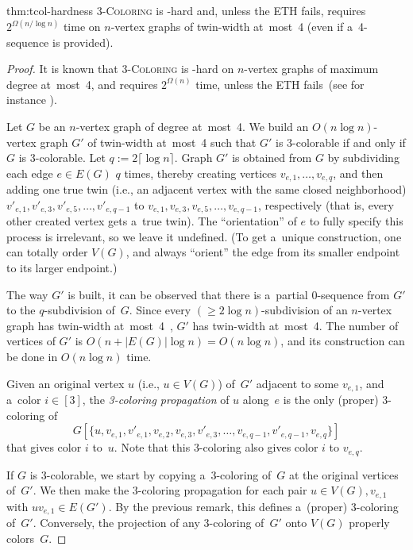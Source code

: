 \documentclass[a4paper,USenglish,cleveref,hyperref,autoref]{lipics-v2021}
\newcommand{\tcol}{\textsc{3-Coloring}\xspace}
\begin{document}
\begin{reptheorem}{thm:tcol-hardness}
  \tcol is \NP-hard and, unless the ETH fails, requires $2^{\Omega(n/\log n)}$ time on $n$-vertex graphs of twin-width at~most~4 (even if a~4-sequence is provided).  
\end{reptheorem}

\begin{proof}
  It is known that \tcol is \NP-hard on $n$-vertex graphs of maximum degree at~most~4, and requires $2^{\Omega(n)}$ time, unless the ETH fails~(see for instance \cite[Lemma 1]{CyganFGKMPS17}).
  
  Let $G$ be an $n$-vertex graph of degree at~most~4.
  We build an $O(n \log n)$-vertex graph $G'$ of twin-width at~most~4 such that $G'$ is 3-colorable if and only if $G$ is 3-colorable.
  Let $q := 2 \lceil \log n \rceil$.
  Graph $G'$ is obtained from $G$ by subdividing each edge $e \in E(G)$ $q$ times, thereby creating vertices $v_{e,1}, \ldots, v_{e,q}$, and then adding one true twin (i.e., an adjacent vertex with the same closed neighborhood) $v'_{e,1}, v'_{e,3}, v'_{e,5}, \ldots, v'_{e,q-1}$ to $v_{e,1}, v_{e,3}, v_{e,5}, \ldots, v_{e,q-1}$, respectively (that is, every other created vertex gets a~true twin).
  The ``orientation'' of $e$ to fully specify this process is irrelevant, so we leave it undefined.
  (To get a~unique construction, one can totally order $V(G)$, and always ``orient'' the edge from its smaller endpoint to its larger endpoint.)

  The way $G'$ is built, it can be observed that there is a~partial 0-sequence from $G'$ to the $q$-subdivision of~$G$.
  Since every $(\geqslant 2 \log n)$-subdivision of an $n$-vertex graph has twin-width at~most~4~\cite{BergeBonnetDepres}, $G'$ has twin-width at~most~4.
  The number of vertices of $G'$ is $O(n+|E(G)| \log n)=O(n \log n)$, and its construction can be done in $O(n \log n)$ time.

  Given an original vertex $u$ (i.e., $u \in V(G)$) of~$G'$ adjacent to some $v_{e,1}$, and a~color $i \in [3]$, the \emph{3-coloring propagation} of $u$ along~$e$ is the only (proper) 3-coloring of \[G[\{u,v_{e,1},v'_{e,1},v_{e,2},v_{e,3},v'_{e,3}, \ldots, v_{e,q-1},v'_{e,q-1},v_{e,q}\}]\] that gives color $i$ to~$u$.
  Note that this 3-coloring also gives color $i$ to $v_{e,q}$.
  
  If $G$ is 3-colorable, we start by copying a~3-coloring of~$G$ at the original vertices of~$G'$.
  We then make the 3-coloring propagation for each pair $u \in V(G), v_{e,1}$ with $uv_{e,1} \in E(G')$.
  By the previous remark, this defines a~(proper) 3-coloring of~$G'$.
  Conversely, the projection of any 3-coloring of~$G'$ onto $V(G)$ properly colors~$G$.
\end{proof}
\end{document}
